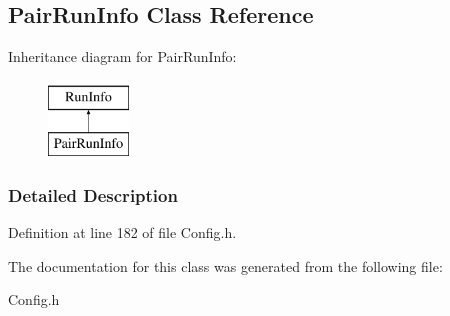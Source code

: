 \hypertarget{classPairRunInfo}{
\subsection{PairRunInfo Class Reference}
\label{classPairRunInfo}
}
Inheritance diagram for PairRunInfo:\begin{figure}[H]
\begin{center}
\leavevmode
\includegraphics[height=2.000000cm]{classPairRunInfo}
\end{center}
\end{figure}


\subsubsection{Detailed Description}


Definition at line 182 of file Config.h.



The documentation for this class was generated from the following file:\begin{DoxyCompactItemize}
\item 
Config.h\end{DoxyCompactItemize}
